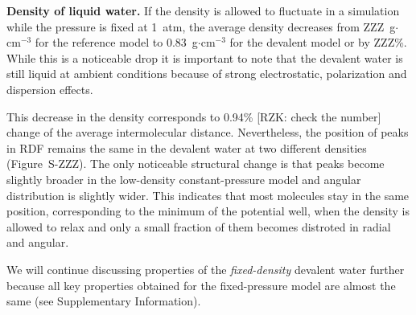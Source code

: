 \documentclass[aps,prl,reprint,amsmath,amssymb]{revtex4-1}
\begin{document}

\textbf{Density of liquid water.} If the density is allowed to fluctuate in a simulation while the pressure is fixed at 1~atm, the average density decreases from ZZZ~g$\cdot$cm$^{-3}$ for the reference model to 0.83~g$\cdot$cm$^{-3}$ for the devalent model or by ZZZ\%. While this is a noticeable drop it is important to note that the devalent water is still liquid at ambient conditions because of strong electrostatic, polarization and dispersion effects. 

This decrease in the density corresponds to 0.94\% [RZK: check the number] change of the average intermolecular distance. Nevertheless, the position of peaks in RDF remains the same in the devalent water at two different densities (Figure~S-ZZZ). The only noticeable structural change is that peaks become slightly broader in the low-density constant-pressure model and angular distribution is slightly wider. This indicates that most molecules stay in the same position, corresponding to the minimum of the potential well, when the density is allowed to relax and only a small fraction of them becomes distroted in radial and angular. 

We will continue discussing properties of the \emph{fixed-density} devalent water further because all key properties obtained for the fixed-pressure model are almost the same (see Supplementary Information).

\end{document}
